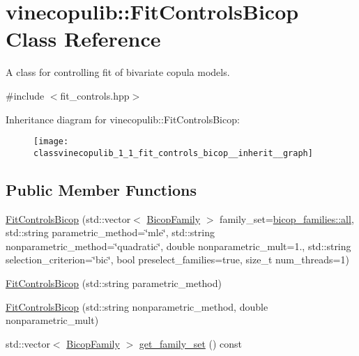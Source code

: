 \hypertarget{classvinecopulib_1_1_fit_controls_bicop}{}\section{vinecopulib\+:\+:Fit\+Controls\+Bicop Class Reference}
\label{classvinecopulib_1_1_fit_controls_bicop}


A class for controlling fit of bivariate copula models.  




{\ttfamily \#include $<$fit\+\_\+controls.\+hpp$>$}



Inheritance diagram for vinecopulib\+:\+:Fit\+Controls\+Bicop\+:\nopagebreak
\begin{figure}[H]
\begin{center}
\leavevmode
\texttt{[image: classvinecopulib\_1\_1\_fit\_controls\_bicop\_\_inherit\_\_graph]}
\end{center}
\end{figure}
\subsection*{Public Member Functions}
\begin{DoxyCompactItemize}
\item 
\hyperlink{classvinecopulib_1_1_fit_controls_bicop_aa94ab9c21f19900d1bf34c43bf59e50d}{Fit\+Controls\+Bicop} (std\+::vector$<$ \hyperlink{namespacevinecopulib_a42e95cc06d33896199caab0c11ad44f3}{Bicop\+Family} $>$ family\+\_\+set=\hyperlink{namespacevinecopulib_1_1bicop__families_a5214a513f41ec23b74782aab96ea6774}{bicop\+\_\+families\+::all}, std\+::string parametric\+\_\+method=\char`\"{}mle\char`\"{}, std\+::string nonparametric\+\_\+method=\char`\"{}quadratic\char`\"{}, double nonparametric\+\_\+mult=1., std\+::string selection\+\_\+criterion=\char`\"{}bic\char`\"{}, bool preselect\+\_\+families=true, size\+\_\+t num\+\_\+threads=1)
\item 
\hyperlink{classvinecopulib_1_1_fit_controls_bicop_a6a2fc00794c9dd9d598ac9948e7b98e4}{Fit\+Controls\+Bicop} (std\+::string parametric\+\_\+method)
\item 
\hyperlink{classvinecopulib_1_1_fit_controls_bicop_af1dfc8d80eba3ce6cfa8bf21fe49cc1a}{Fit\+Controls\+Bicop} (std\+::string nonparametric\+\_\+method, double nonparametric\+\_\+mult)
\end{DoxyCompactItemize}
\begin{DoxyCompactItemize}
\item 
std\+::vector$<$ \hyperlink{namespacevinecopulib_a42e95cc06d33896199caab0c11ad44f3}{Bicop\+Family} $>$ \hyperlink{classvinecopulib_1_1_fit_controls_bicop_a8ea096aec62cbca55641941c9b4cf8f8}{get\+\_\+family\+\_\+set} () const 
\end{DoxyCompactItemize}


